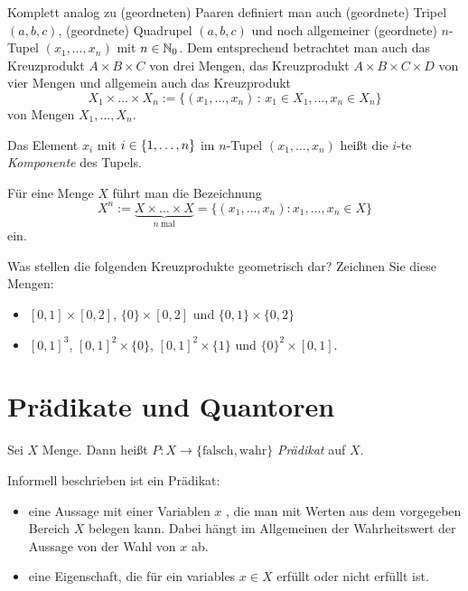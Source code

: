 \begin{defn} 
	Komplett analog zu (geordneten) Paaren definiert man auch (geordnete) Tripel $(a,b,c)$, (geordnete) Quadrupel $(a,b,c)$ und noch allgemeiner (geordnete) $n$-Tupel $(x_1,\ldots,x_n)$ mit $n \in \mathbb{N}_0$. Dem entsprechend betrachtet man auch das Kreuzprodukt $A \times B \times C$ von drei Mengen, das Kreuzprodukt $A \times B \times C \times D$ von vier Mengen und allgemein auch das Kreuzprodukt 
	\[
		X_1 \times \ldots \times X_n := \{ (x_1,\ldots,x_n) \,:\, x_1 \in X_1, \ldots , x_n \in X_n \} 
	\]
	 von Mengen $ X_1,\ldots,X_n $.
	 
	 Das Element $ x_i $ mit $ i \in \{ 1,\ldots,n \} $ im $ n $-Tupel $ (x_1,\ldots,x_n) $ heißt die $ i $-te \emph{Komponente} des Tupels.
	 
Für eine Menge $ X $ führt man die Bezeichnung
\begin{equation*}
	X^n := \underbrace{X \times \ldots \times X}_{n \:\text{mal}} = \{ (x_1,\ldots,x_n) : x_1,\ldots,x_n \in X \}
\end{equation*}
ein. 
\end{defn} 


\begin{aufg} Was stellen die folgenden Kreuzprodukte geometrisch dar? Zeichnen Sie diese Mengen:
	\begin{itemize}
		\item $ [0,1] \times [0,2] $, $ \{ 0 \} \times [0,2] $  und $ \{ 0,1 \} \times \{ 0,2 \} $ 
		\item $ [0,1]^3 $, $ [0,1]^2 \times \{ 0 \} $, $ [0,1]^2 \times \{ 1 \} $  und $ \{ 0 \}^2 \times [0,1] $. 
	\end{itemize}
\end{aufg}

\section{Prädikate und Quantoren}


\begin{defn}
Sei $ X $ Menge. Dann heißt $ P : X \to \{ \text{falsch},\text{wahr} \} $ \emph{Prädikat} auf $ X $. 
\end{defn} 

\begin{bem}
	Informell beschrieben ist ein Prädikat:
	\begin{itemize}
		\item  eine Aussage mit einer Variablen $x$ , die man mit Werten aus dem vorgegeben Bereich  $X$ belegen kann. Dabei hängt im Allgemeinen der Wahrheitswert der Aussage von der Wahl von $x$ ab. 
		\item eine Eigenschaft, die für ein variables $x \in X$ erfüllt oder nicht erfüllt ist. 
	\end{itemize} 
\end{bem}

